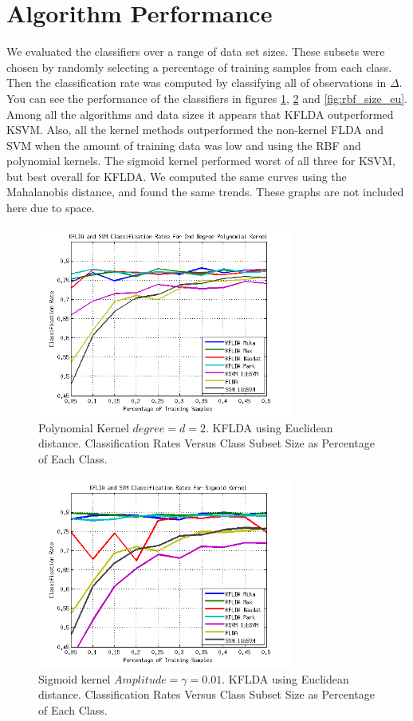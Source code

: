 \documentclass[journal]{IEEEtran}
\begin{document}
\section{Algorithm Performance}
\par We evaluated the classifiers over a range of data set sizes. These subsets were chosen by randomly selecting a percentage of training samples from each class. Then the classification rate was computed by classifying all of observations in \(\Delta\). You can see the performance of the classifiers in figures \ref{fig:poly_size_eu}, \ref{fig:sig_size_eu} and \ref{fig:rbf_size_eu}. Among all the algorithms and data sizes it appears that KFLDA outperformed KSVM. Also, all the kernel methods outperformed the non-kernel FLDA and SVM when the amount of training data was low and using the RBF and polynomial kernels. The sigmoid kernel performed worst of all three for KSVM, but best overall for KFLDA. We computed the same curves using the Mahalanobis distance, and found the same trends. These graphs are not included here due to space.

\begin{figure}[!h]
\centering
\includegraphics[width=3.3in]{../images/poly_size_3.png}
\caption{Polynomial Kernel \(degree = d = 2\). KFLDA using Euclidean distance. Classification Rates Versus Class Subset Size as Percentage of Each Class.}
\label{fig:poly_size_eu}
\end{figure}

\begin{figure}[!h]
\centering
\includegraphics[width=3.3in]{../images/sig_size_3.png}
\caption{Sigmoid kernel \(Amplitude = \gamma = 0.01\). KFLDA using Euclidean distance. Classification Rates Versus Class Subset Size as Percentage of Each Class.}
\label{fig:sig_size_eu}
\end{figure}
\end{document}
